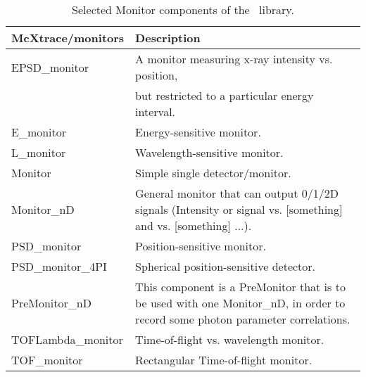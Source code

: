 \begin{table}
  \begin{center}
    {\let\my=\\
    \begin{tabular}{|p{}|p{}|}
      \hline
       {\bfseries McXtrace/monitors} & Description \\
       \hline
EPSD\_monitor    &    A monitor measuring x-ray intensity vs. position,\\
       &but restricted to a particular energy interval.\\
E\_monitor       &    Energy-sensitive monitor. \\
L\_monitor        &  Wavelength-sensitive monitor. \\
Monitor          &   Simple single detector/monitor. \\
Monitor\_nD      &   General monitor that can output
                    0/1/2D signals (Intensity or signal vs. [something]
                    and vs. [something] ...). \\
PSD\_monitor     &    Position-sensitive monitor. \\
PSD\_monitor\_4PI  &   Spherical position-sensitive detector. \\
PreMonitor\_nD    &   This component is a PreMonitor that is to be
                    used with one Monitor\_nD,
                    in order to record some photon parameter correlations. \\
TOFLambda\_monitor &  Time-of-flight vs. wavelength monitor. \\
TOF\_monitor     &    Rectangular Time-of-flight monitor. \\
      \hline
    \end{tabular}
    \caption{Selected Monitor components of the \MCX\ library.}
    \label{t:comp-monitors}
    }
  \end{center}
\end{table}

